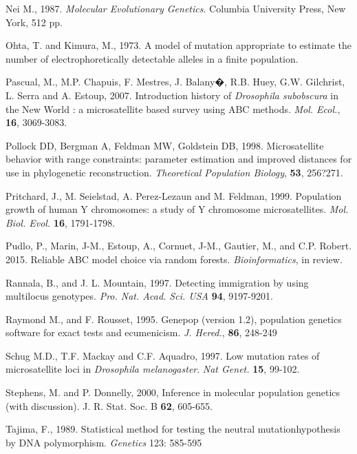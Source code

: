 \begin{thebibliography}{a}
 Nei M., 1987. \emph{Molecular Evolutionary
Genetics}. Columbia University Press, New York, 512 pp.

 Ohta, T. and Kimura, M., 1973.
A model of mutation appropriate to estimate the number of electrophoretically
detectable alleles in a finite population.

Pascual, M., M.P. Chapuis,
F. Mestres, J. Balany�, R.B. Huey, G.W. Gilchrist, L. Serra and A.
Estoup, 2007. Introduction history of \emph{Drosophila subobscura}
in the New World : a microsatellite based survey using ABC methods.
\emph{Mol. Ecol.}, \textbf{16}, 3069-3083.

Pollock DD, Bergman
A, Feldman MW, Goldstein DB, 1998. Microsatellite behavior with range
constraints: parameter estimation and improved distances for use in
phylogenetic reconstruction. \emph{Theoretical Population Biology},
\textbf{53}, 256?271.

 Pritchard, J., M. Seielstad,
A. Perez-Lezaun and M. Feldman, 1999. Population growth of human Y
chromosomes: a study of Y chromosome microsatellites. \emph{Mol. Biol.
Evol.} \textbf{16}, 1791-1798.

Pudlo, P., Marin, J-M., Estoup, A., Cornuet, J-M.,
Gautier, M., and C.P. Robert. 2015. Reliable ABC model choice via
random forests. \emph{Bioinformatics}, in review.

Rannala, B., and J. L.
Mountain, 1997. Detecting immigration by using multilocus genotypes.
\emph{Pro. Nat. Acad. Sci. USA} \textbf{94}, 9197-9201.

 Raymond M., and F. Rousset,
1995. Genepop (version 1.2), population genetics software for exact
tests and ecumenicism. \emph{J. Hered.}, \textbf{86}, 248-249

 Schug M.D., T.F. Mackay
and C.F. Aquadro, 1997. Low mutation rates of microsatellite loci
in \emph{Drosophila melanogaster}. \emph{Nat Genet.} \textbf{15},
99-102.

 Stephens, M. and P.
Donnelly, 2000, Inference in molecular population genetics (with discussion).
J. R. Stat. Soc. B \textbf{62}, 605-655.

Tajima, F., 1989. Statistical method
for testing the neutral mutationhypothesis by DNA polymorphism. \emph{Genetics}
123: 585-595


\end{thebibliography}
